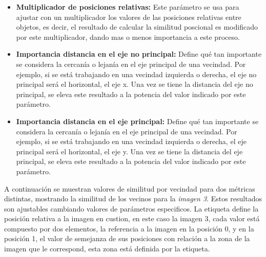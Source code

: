 \begin{itemize}
    \item \textbf{Multiplicador de posiciones relativas:} Este parámetro se usa para ajustar con un multiplicador los valores de las posiciones relativas entre objetos, es decir, el resultado de calcular la similitud poscional es modificado por este multiplicador, dando mas o menos importancia a este proceso. 

    \item \textbf{Importancia distancia en el eje no principal:} Define qué tan importante se considera la cercanía o lejanía en el eje principal de una vecindad. Por ejemplo, si se est\'a trabajando en una vecindad izquierda o derecha, el eje no principal será el horizontal, el eje x. Una vez se tiene la distancia del eje no principal, se eleva este resultado a la potencia del valor indicado por este par\'ametro.

    \item \textbf{Importancia distancia en el eje principal:} Define qué tan importante se considera la cercanía o lejanía en el eje principal de una vecindad. Por ejemplo, si se est\'a trabajando en una vecindad izquierda o derecha, el eje principal será el horizontal, el eje y. Una vez se tiene la distancia del eje principal, se eleva este resultado a la potencia del valor indicado por este par\'ametro.
\end{itemize}

A continuación se muestran valores de similitud por vecindad para dos métricas distintas, mostrando la similitud de los vecinos para la \textit{imagen 3}. Estos resultados son ajustables cambiando valores de parámetros especificos. La etiqueta define la posición relativa a la imagen en custion, en este caso la imagen 3, cada valor está compuesto por dos elementos, la referencia a la imagen en la posici\'on 0, y en la posici\'on 1, el valor de semejanza de sus posiciones con relación a la zona de la imagen que le correspond, esta zona est\'a definida por la etiqueta.

